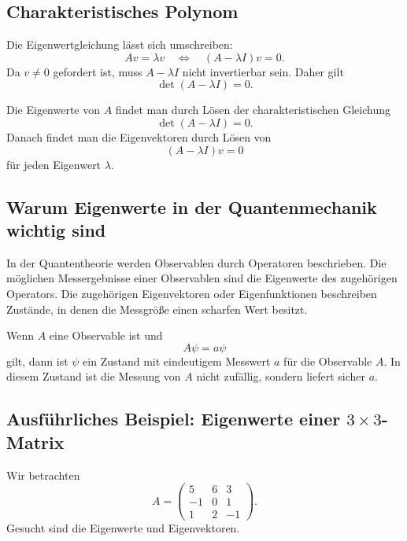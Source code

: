 \subsection{Charakteristisches Polynom}

Die Eigenwertgleichung lässt sich umschreiben:
\[
    Av=\lambda v
    \quad\Longleftrightarrow\quad
    (A-\lambda I)v=0.
\]
Da $v\ne0$ gefordert ist, muss $A-\lambda I$ nicht invertierbar sein. Daher gilt
\[
    \det(A-\lambda I)=0.
\]

\begin{formulabox}
Die Eigenwerte von $A$ findet man durch Lösen der charakteristischen Gleichung
\[
    \det(A-\lambda I)=0.
\]
Danach findet man die Eigenvektoren durch Lösen von
\[
    (A-\lambda I)v=0
\]
für jeden Eigenwert $\lambda$.
\end{formulabox}

\subsection{Warum Eigenwerte in der Quantenmechanik wichtig sind}

In der Quantentheorie werden Observablen durch Operatoren beschrieben. Die möglichen Messergebnisse einer Observablen sind die Eigenwerte des zugehörigen Operators. Die zugehörigen Eigenvektoren oder Eigenfunktionen beschreiben Zustände, in denen die Messgröße einen scharfen Wert besitzt.

\begin{conceptbox}
Wenn $A$ eine Observable ist und
\[
    A\psi=a\psi
\]
gilt, dann ist $\psi$ ein Zustand mit eindeutigem Messwert $a$ für die Observable $A$. In diesem Zustand ist die Messung von $A$ nicht zufällig, sondern liefert sicher $a$.
\end{conceptbox}

\subsection{Ausführliches Beispiel: Eigenwerte einer $3\times3$-Matrix}

Wir betrachten
\[
    A=
    \begin{pmatrix}
        5&6&3\\
        -1&0&1\\
        1&2&-1
    \end{pmatrix}.
\]
Gesucht sind die Eigenwerte und Eigenvektoren.

